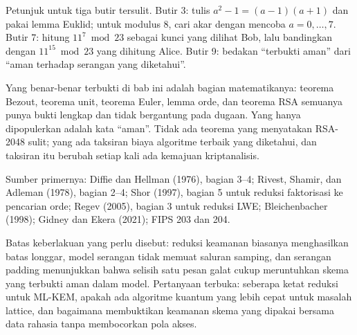 \begin{latihan}
Petunjuk untuk tiga butir tersulit. Butir 3: tulis $a^2-1=(a-1)(a+1)$ dan pakai lemma Euklid;
untuk modulus $8$, cari akar dengan mencoba $a=0,\dots,7$. Butir 7: hitung $11^7\bmod23$
sebagai kunci yang dilihat Bob, lalu bandingkan dengan $11^{15}\bmod23$ yang dihitung Alice.
Butir 9: bedakan ``terbukti aman'' dari ``aman terhadap serangan yang diketahui''.
\end{latihan}

\begin{untukpeneliti}
Yang benar-benar terbukti di bab ini adalah bagian matematikanya: teorema Bezout, teorema unit,
teorema Euler, lemma orde, dan teorema RSA semuanya punya bukti lengkap dan tidak bergantung
pada dugaan. Yang hanya dipopulerkan adalah kata ``aman''. Tidak ada teorema yang menyatakan
RSA-2048 sulit; yang ada taksiran biaya algoritme terbaik yang diketahui, dan taksiran itu
berubah setiap kali ada kemajuan kriptanalisis.

Sumber primernya: Diffie dan Hellman (1976), bagian 3--4; Rivest, Shamir, dan Adleman (1978),
bagian 2--4; Shor (1997), bagian 5 untuk reduksi faktorisasi ke pencarian orde; Regev (2005),
bagian 3 untuk reduksi LWE; Bleichenbacher (1998); Gidney dan Ekera (2021); FIPS 203 dan 204.

Batas keberlakuan yang perlu disebut: reduksi keamanan biasanya menghasilkan batas longgar,
model serangan tidak memuat saluran samping, dan serangan padding menunjukkan bahwa selisih satu
pesan galat cukup meruntuhkan skema yang terbukti aman dalam model. Pertanyaan terbuka: seberapa
ketat reduksi untuk ML-KEM, apakah ada algoritme kuantum yang lebih cepat untuk masalah lattice,
dan bagaimana membuktikan keamanan skema yang dipakai bersama data rahasia tanpa membocorkan
pola akses.
\end{untukpeneliti}

